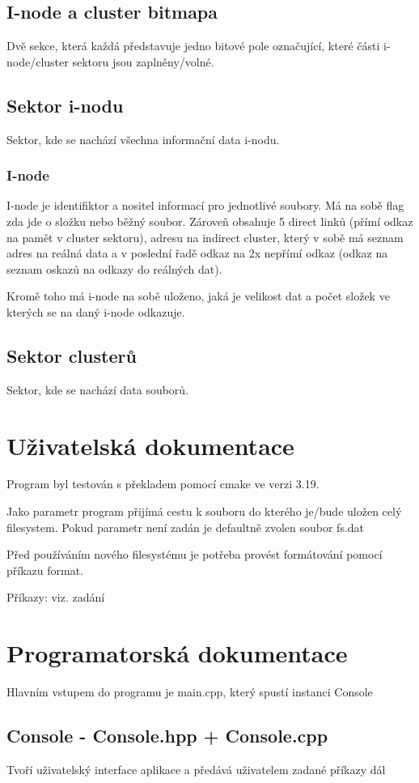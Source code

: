 \documentclass[a4paper,12pt]{article}
\begin{document}
	\subsection{I-node a cluster bitmapa}
	Dvě sekce, která každá představuje jedno bitové pole označující, které části i-node/cluster sektoru jsou zaplněny/volné.
	\subsection{Sektor i-nodu}
	Sektor, kde se nachází všechna informační data i-nodu.
	\subsubsection{I-node}
	I-node je identifiktor a nositel informací pro jednotlivé soubory. Má na sobě flag zda jde o složku nebo běžný soubor. Zároveň obsahuje 5 direct linků (přímí odkaz na pamět v cluster sektoru), adresu na indirect cluster, který v sobě má seznam adres na reálná data a v poslední řadě odkaz na 2x nepřímí odkaz (odkaz na seznam oskazů na odkazy do reálných dat).

	Kromě toho má i-node na sobě uloženo, jaká je velikost dat a počet složek ve kterých se na daný i-node odkazuje.
	\subsection{Sektor clusterů}
	Sektor, kde se nachází data souborů.

	\newpage
	\section{Uživatelská dokumentace}
	Program byl testován s překladem pomocí cmake ve verzi 3.19.

	Jako parametr program přijímá cestu k souboru do kterého je/bude uložen celý filesystem. Pokud parametr není zadán je defaultně zvolen soubor fs.dat

	Před používáním nového filesystému je potřeba provést formátování pomocí příkazu format.

	Příkazy: viz. zadání
	
	\newpage
	\section{Programatorská dokumentace}
	Hlavním vstupem do programu je main.cpp, který spustí instanci Console
	\subsection{Console - Console.hpp + Console.cpp}
	Tvoří uživatelský interface aplikace a předává uživatelem zadané příkazy dál
\end{document}
